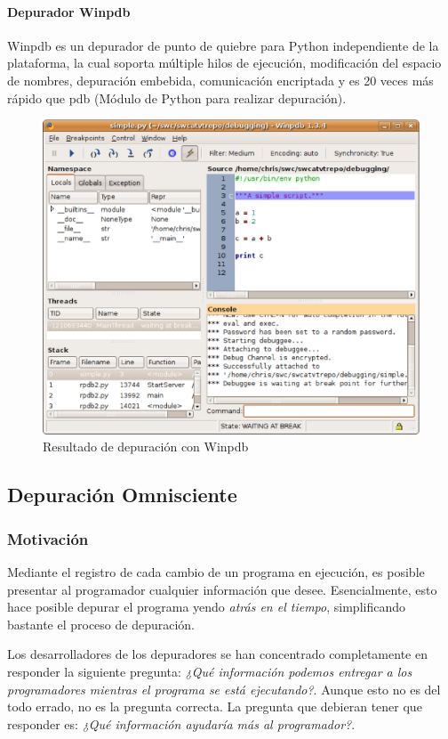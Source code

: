 \documentclass[12pt,legalpaper]{report}
\begin{document}
				\paragraph{Depurador Winpdb }	

Winpdb es un depurador de punto de quiebre para Python independiente de la plataforma, la cual soporta múltiple hilos de ejecución, modificación del espacio de nombres, depuración embebida, comunicación encriptada y es 20 veces más rápido que pdb (Módulo de Python para realizar depuración).

\begin{figure}[h]
	\centering
	\includegraphics[scale=0.35]{images/Winpdb.eps}
	\caption{Resultado de depuración con Winpdb}
\end{figure}


		\subsection{Depuración Omnisciente}
			\subsubsection{Motivación}

Mediante el registro de cada cambio de un programa en ejecución, es posible presentar al programador cualquier información que desee.  Esencialmente, esto hace posible depurar el programa yendo \textit{atrás en el tiempo}, simplificando bastante el proceso de depuración.


Los desarrolladores de los depuradores se han concentrado completamente en responder la siguiente pregunta: \textit{¿Qué información podemos entregar a los programadores mientras el programa se está ejecutando?}.  Aunque esto no es del todo errado, no es la pregunta correcta.  La pregunta que debieran tener que responder es: \textit{¿Qué información ayudaría más al programador?}.
\end{document}
